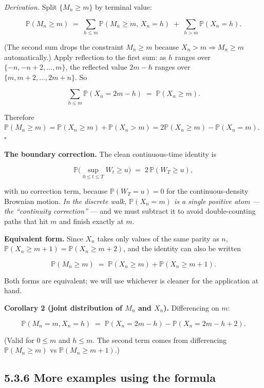\documentclass[
  10pt,
  twoside]{book}
\begin{document}
\emph{Derivation.} Split \(\{M_n \ge m\}\) by terminal value:

\[\mathbb P(M_n \ge m) \;=\; \sum_{h \le m}\mathbb P(M_n \ge m,\, X_n = h) \;+\; \sum_{h > m}\mathbb P(X_n = h).\]

(The second sum drops the constraint \(M_n \ge m\) because
\(X_n > m \Rightarrow M_n \ge m\) automatically.) Apply reflection to
the first sum: as \(h\) ranges over \(\{-n, -n+2, \ldots, m\}\), the
reflected value \(2m - h\) ranges over \(\{m, m+2, \ldots, 2m+n\}\). So

\[\sum_{h \le m}\mathbb P(X_n = 2m - h) \;=\; \mathbb P(X_n \ge m).\]

Therefore
\(\mathbb P(M_n \ge m) = \mathbb P(X_n \ge m) + \mathbb P(X_n > m) = 2\mathbb P(X_n \ge m) - \mathbb P(X_n = m)\).
\(\square\)

\textbf{The boundary correction.} The clean continuous-time identity is

\[\mathbb P\bigl(\sup_{0\le t\le T} W_t \ge u\bigr) \;=\; 2\,\mathbb P(W_T \ge u),\]

with no correction term, because \(\mathbb P(W_T = u) = 0\) for the
continuous-density Brownian motion. \emph{In the discrete walk,
\(\mathbb P(X_n = m)\) is a single positive atom --- the ``continuity
correction''} --- and we must subtract it to avoid double-counting paths
that hit \(m\) and finish exactly at \(m\).

\textbf{Equivalent form.} Since \(X_n\) takes only values of the same
parity as \(n\), \(\mathbb P(X_n \ge m+1) = \mathbb P(X_n \ge m+2)\),
and the identity can also be written

\[\mathbb P(M_n \ge m) \;=\; \mathbb P(X_n \ge m) + \mathbb P(X_n \ge m+1).\]

Both forms are equivalent; we will use whichever is cleaner for the
application at hand.

\textbf{Corollary 2 (joint distribution of \(M_n\) and \(X_n\)).}
Differencing on \(m\):

\[\boxed{\;\mathbb P(M_n = m, X_n = h) \;=\; \mathbb P(X_n = 2m - h) - \mathbb P(X_n = 2m - h + 2).\;}\]

(Valid for \(0 \le m\) and \(h \le m\). The second term comes from
differencing \(\mathbb P(M_n \ge m)\) vs \(\mathbb P(M_n \ge m + 1)\).)

\subsection{5.3.6 More examples using the
formula}\label{more-examples-using-the-formula}
\end{document}
